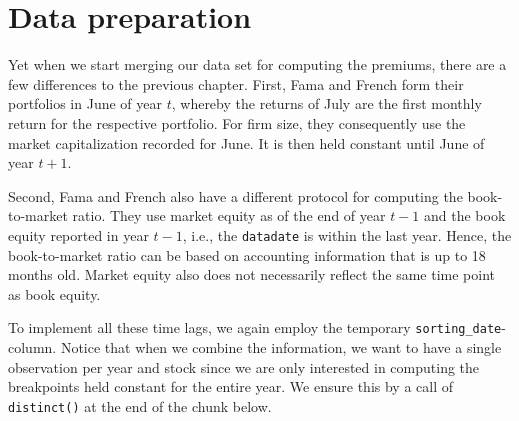 \documentclass[
]{book}
\begin{document}
\hypertarget{data-preparation-3}{%
\section{Data preparation}\label{data-preparation-3}}

Yet when we start merging our data set for computing the premiums, there are a few differences to the previous chapter. First, Fama and French form their portfolios in June of year \(t\), whereby the returns of July are the first monthly return for the respective portfolio. For firm size, they consequently use the market capitalization recorded for June. It is then held constant until June of year \(t+1\).

Second, Fama and French also have a different protocol for computing the book-to-market ratio. They use market equity as of the end of year \(t - 1\) and the book equity reported in year \(t-1\), i.e., the \texttt{datadate} is within the last year. Hence, the book-to-market ratio can be based on accounting information that is up to 18 months old. Market equity also does not necessarily reflect the same time point as book equity.

To implement all these time lags, we again employ the temporary \texttt{sorting\_date}-column. Notice that when we combine the information, we want to have a single observation per year and stock since we are only interested in computing the breakpoints held constant for the entire year. We ensure this by a call of \texttt{distinct()} at the end of the chunk below.
\end{document}
